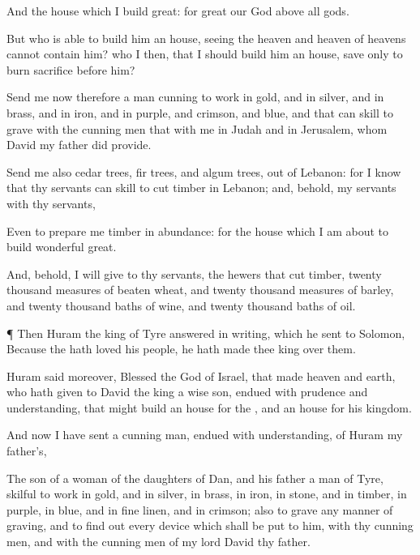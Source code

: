{And the
house which I
build
{}
great: for
great
{} our
God above all
gods.

But who is
able to
build him an
house, seeing the
heaven and
heaven of
heavens cannot
contain him? who
{} I then, that I should
build him an
house, save
only to burn
sacrifice
before him?

Send me now therefore a
man
cunning to
work in
gold, and in
silver, and in
brass, and in
iron, and in
purple, and
crimson, and
blue, and that can
skill to
grave with the cunning
men that
{} with me in
Judah and in
Jerusalem, whom
David my
father did
provide.

Send me also
cedar
trees, fir
trees, and algum
trees, out of
Lebanon: for I
know that thy
servants can
skill to
cut
timber in
Lebanon; and, behold, my
servants
{} with thy
servants,

Even to
prepare me
timber in
abundance: for the
house which I am about to
build
{}
wonderful
great.

And, behold, I will
give to thy
servants, the
hewers that
cut
timber,
twenty
thousand
measures of
beaten
wheat, and
twenty
thousand
measures of
barley, and
twenty
thousand
baths of
wine, and
twenty
thousand
baths of
oil.


\par }{\PP {}¶ Then
Huram the
king of
Tyre
answered in
writing, which he
sent to
Solomon, Because the
{} hath
loved his
people, he hath
made thee
king over them.

Huram
said moreover,
Blessed
{} the
{}
God of
Israel, that
made
heaven and
earth, who hath
given to
David the
king a
wise
son,
endued with
prudence and
understanding, that might
build an
house for the
{}, and an
house for his
kingdom.

And now I have
sent a
cunning
man,
endued with
understanding, of
Huram my
father’s,

The
son of a
woman of the
daughters of
Dan, and his
father
{} a
man of
Tyre,
skilful to
work in
gold, and in
silver, in
brass, in
iron, in
stone, and in
timber, in
purple, in
blue, and in fine
linen, and in
crimson; also to
grave any manner of
graving, and to find
out every
device which shall be
put to him, with thy cunning
men, and with the cunning
men of my
lord
David thy
father.

}
